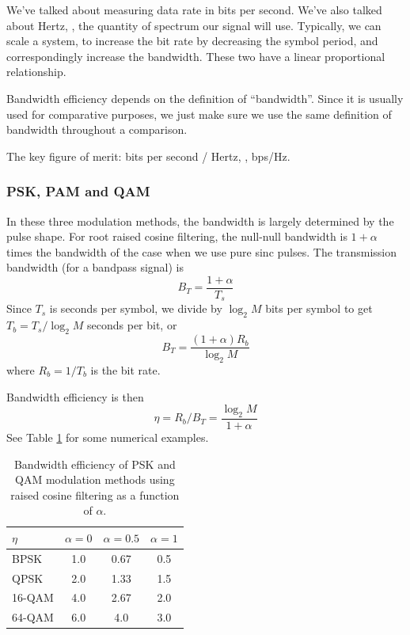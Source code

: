 We've talked about measuring data rate in bits per second. We've
also talked about Hertz, \ie, the quantity of spectrum our signal
will use.  Typically, we can scale a system, to increase the bit
rate by decreasing the symbol period, and correspondingly increase
the bandwidth.  These two have a linear proportional relationship.

Bandwidth efficiency depends on the definition of ``bandwidth''.  Since it is usually used for comparative purposes, we just make sure we use the same definition of bandwidth throughout a comparison.

The key figure of merit:  bits per second / Hertz, \ie, bps/Hz.

\subsubsection{PSK, PAM and QAM}

In these three modulation methods, the bandwidth is largely
determined by the pulse shape.  For root raised cosine filtering,
the null-null bandwidth is $1+\alpha$ times the bandwidth of the
case when we use pure sinc pulses.  The transmission bandwidth (for
a bandpass signal) is
\[
  B_T = \frac{1+\alpha}{T_{s}}
\]
Since $T_{s}$ is seconds per symbol, we divide by $\log_2 M$ bits
per symbol to get $T_b = T_{s} / \log_2 M$ seconds per bit, or
\[
  B_T = \frac{(1+\alpha)R_b}{\log_2 M}
\]
where $R_b = 1/ T_b$ is the bit rate.

Bandwidth efficiency is then
\[
  \eta = R_b/B_T = \frac{\log_2 M}{1+\alpha}
\]
See Table \ref{T:BW_Efficiency} for some numerical examples.

\begin{table}
  \centering
\begin{tabular}{|l|ccc|}
  \hline
  $\eta$ & $\alpha=0$ & $\alpha=0.5$ & $\alpha=1$ \\
  \hline
  BPSK   & 1.0        & 0.67         & 0.5 \\
  QPSK   & 2.0        & 1.33         & 1.5 \\
  16-QAM & 4.0        & 2.67         & 2.0 \\
  64-QAM & 6.0        & 4.0          & 3.0 \\
  \hline
\end{tabular}
  \caption{Bandwidth efficiency of PSK and QAM modulation methods
  using raised cosine filtering as a function of $\alpha$.}\label{T:BW_Efficiency}
\end{table}


